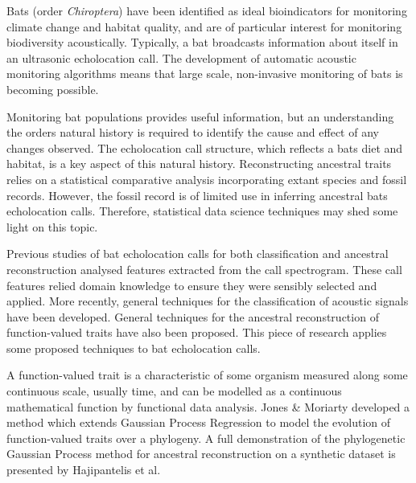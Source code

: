 \documentclass[wsdraft]{ws-rv9x6} %
\begin{document}
Bats (order \textit{Chiroptera}) have been identified as ideal bioindicators for monitoring climate change and habitat quality,\cite{jones2009carpe} and are of particular interest for monitoring biodiversity acoustically. Typically, a bat broadcasts information about itself in an ultrasonic echolocation call.\cite{griffin1944echolocation} The development of automatic acoustic monitoring algorithms \cite{stathopoulos2017bat} \cite{walters2012continental} means that large scale, non-invasive monitoring of bats is becoming possible.   

Monitoring bat populations provides useful information, but an understanding the orders natural history is required to identify the cause and effect of any changes observed. The echolocation call structure, which reflects a bats diet and habitat,\cite{aldridge1987morphology}  is a key aspect of this natural history. Reconstructing ancestral traits\cite{joy2016ancestral} relies on a statistical comparative analysis incorporating extant species and fossil records. \cite{felsenstein2004inferring} However, the fossil record is of limited use in inferring ancestral bats echolocation calls. Therefore, statistical data science techniques may shed some light on this topic.

Previous studies of bat echolocation calls for both classification \cite{walters2012continental} and ancestral reconstruction \cite{collen2012evolution} analysed features extracted from the call spectrogram. These call features relied domain knowledge to ensure they were sensibly selected and applied. More recently, general techniques for the classification of acoustic signals have been developed. \cite{stathopoulos2014bat} \cite{damoulas2010bayesian} General techniques for the ancestral reconstruction of function-valued traits have also been proposed. \cite{group2012phylogenetic} This piece of research applies some proposed techniques to bat echolocation calls.

A function-valued trait\cite{meyer2005up} is a characteristic of some organism measured along some continuous scale, usually time, and can be modelled as a continuous mathematical function by functional data analysis. \cite{ramsay2006functional} Jones \& Moriarty \cite{jones2013evolutionary} developed a method which extends Gaussian Process Regression \cite{rasmussen2006gaussian} to model the evolution of function-valued traits over a phylogeny. A full demonstration of the phylogenetic Gaussian Process method for ancestral reconstruction on a synthetic dataset is presented by Hajipantelis et al.\cite{hadjipantelis2013function}
\end{document}
